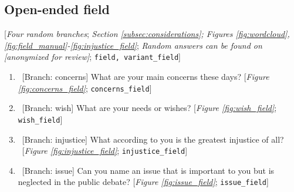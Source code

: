 \begin{enumerate}[resume]


\end{enumerate} 

 \subsection*{Open-ended field} 
 [\textit{Four random branches}; \textit{Section \ref{subsec:considerations}; Figures \ref{fig:wordcloud}, \ref{fig:field_manual}-\ref{fig:injustice_field}}; \textit{Random answers can be found on [anonymized for review]}; 
 \verb|field, variant_field|] 
 \begin{enumerate}[resume] 
\item  \label{q:concerns_field} ~[Branch: concerns] What are your main concerns these days? [\textit{Figure \ref{fig:concerns_field}}; 
\verb|concerns_field|]


\item  \label{q:wish_field} ~[Branch: wish] What are your needs or wishes? [\textit{Figure \ref{fig:wish_field}}; 
\verb|wish_field|]


\item  \label{q:injustice_field} ~[Branch: injustice] What according to you is the greatest injustice of all?\\ 
~[\textit{Figure \ref{fig:injustice_field}}; 
\verb|injustice_field|]


\item  \label{q:issue_field} ~[Branch: issue] Can you name an issue that is important to you but is neglected in the public debate? [\textit{Figure \ref{fig:issue_field}}; 
\verb|issue_field|]


\end{enumerate} 

